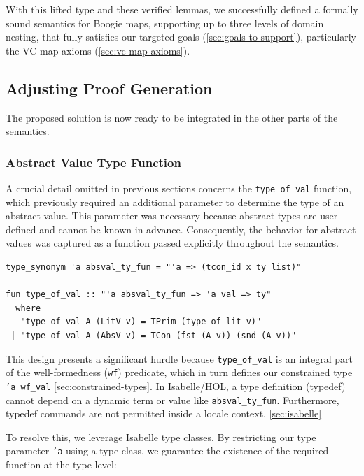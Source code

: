 \documentclass[11pt]{article}
\begin{document}
With this lifted type and these verified lemmas, we successfully defined a formally sound semantics for Boogie maps, supporting up to three levels of domain nesting, that fully satisfies our targeted goals (\ref{sec:goals-to-support}), particularly the VC map axioms (\ref{sec:vc-map-axioms}).


\subsection{Adjusting Proof Generation}
\label{sec:proofgen-module}

The proposed solution is now ready to be integrated in the other parts of the semantics.

\subsubsection{Abstract Value Type Function}

A crucial detail omitted in previous sections concerns the \texttt{type\_of\_val} function, which previously required an additional parameter to determine the type of an abstract value.
This parameter was necessary because abstract types are user-defined and cannot be known in advance.
Consequently, the behavior for abstract values was captured as a function passed explicitly throughout the semantics.

\begin{verbatim}
type_synonym 'a absval_ty_fun = "'a => (tcon_id x ty list)"

fun type_of_val :: "'a absval_ty_fun => 'a val => ty"
  where 
   "type_of_val A (LitV v) = TPrim (type_of_lit v)"
 | "type_of_val A (AbsV v) = TCon (fst (A v)) (snd (A v))"
\end{verbatim}

This design presents a significant hurdle because \texttt{type\_of\_val} is an integral part of the well-formedness (\texttt{wf}) predicate,
which in turn defines our constrained type \texttt{'a wf\_val} \ref{sec:constrained-types}.
In Isabelle/HOL, a type definition (typedef) cannot depend on a dynamic term or value like \texttt{absval\_ty\_fun}.
Furthermore, typedef commands are not permitted inside a locale context. \ref{sec:isabelle}

To resolve this, we leverage Isabelle type classes.
By restricting our type parameter \texttt{'a} using a type class,
we guarantee the existence of the required function at the type level:
\end{document}
